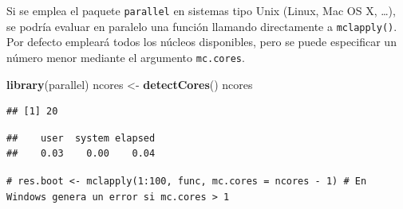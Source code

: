 \documentclass[
]{book}
\newenvironment{Shaded}{\begin{snugshade}}{\end{snugshade}}
\newcommand{\AttributeTok}[1]{\textcolor[rgb]{0.13,0.29,0.53}{#1}}
\newcommand{\CommentTok}[1]{\textcolor[rgb]{0.56,0.35,0.01}{\textit{#1}}}
\newcommand{\ConstantTok}[1]{\textcolor[rgb]{0.56,0.35,0.01}{#1}}
\newcommand{\ControlFlowTok}[1]{\textcolor[rgb]{0.13,0.29,0.53}{\textbf{#1}}}
\newcommand{\DecValTok}[1]{\textcolor[rgb]{0.00,0.00,0.81}{#1}}
\newcommand{\FunctionTok}[1]{\textcolor[rgb]{0.13,0.29,0.53}{\textbf{#1}}}
\newcommand{\NormalTok}[1]{#1}
\newcommand{\OtherTok}[1]{\textcolor[rgb]{0.56,0.35,0.01}{#1}}
\newcommand{\SpecialCharTok}[1]{\textcolor[rgb]{0.81,0.36,0.00}{\textbf{#1}}}
\newcommand{\StringTok}[1]{\textcolor[rgb]{0.31,0.60,0.02}{#1}}
\theoremstyle{break}
\theoremstyle{nonumberplain}
\renewcommand{\CommentTok}[1]{\textcolor[rgb]{0.41,0.41,0.41}{\texttt{#1}}}
\begin{document}
Si se emplea el paquete \texttt{parallel} en sistemas tipo Unix (Linux, Mac OS X, \ldots), se podría
evaluar en paralelo una función llamando directamente a \texttt{mclapply()}.
Por defecto empleará todos los núcleos disponibles, pero se puede especificar un número menor
mediante el argumento \texttt{mc.cores}.

\begin{Shaded}
\begin{Highlighting}[]
\FunctionTok{library}\NormalTok{(parallel)}
\NormalTok{ncores }\OtherTok{\textless{}{-}} \FunctionTok{detectCores}\NormalTok{()}
\NormalTok{ncores}
\end{Highlighting}
\end{Shaded}

\begin{verbatim}
## [1] 20
\end{verbatim}

\begin{Shaded}
\end{Shaded}

\begin{verbatim}
##    user  system elapsed 
##    0.03    0.00    0.04
\end{verbatim}

\begin{Shaded}
\begin{Highlighting}[]
\CommentTok{\# res.boot \textless{}{-} mclapply(1:100, func, mc.cores = ncores {-} 1) \# En Windows genera un error si mc.cores \textgreater{} 1}
\end{Highlighting}
\end{Shaded}
\end{document}
